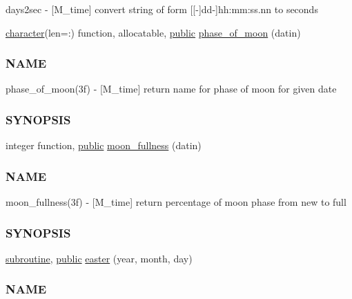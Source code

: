 \begin{DoxyCompactItemize}
\begin{DoxyCompactList}
days2sec -\/ \mbox{[}M\+\_\+time\mbox{]} convert string of form \mbox{[}\mbox{[}-\/\mbox{]}dd-\/\mbox{]}hh\+:mm\+:ss.\+nn to seconds \end{DoxyCompactList}\item 
\hyperlink{option__stopwatch_83_8txt_abd4b21fbbd175834027b5224bfe97e66}{character}(len=\+:) function, allocatable, \hyperlink{M__stopwatch_83_8txt_a2f74811300c361e53b430611a7d1769f}{public} \hyperlink{namespacem__time_ab8a976e2f113cc38b6df80974cee55dc}{phase\+\_\+of\+\_\+moon} (datin)
\begin{DoxyCompactList}\small\item\em \subsubsection*{N\+A\+ME}

phase\+\_\+of\+\_\+moon(3f) -\/ \mbox{[}M\+\_\+time\mbox{]} return name for phase of moon for given date \subsubsection*{S\+Y\+N\+O\+P\+S\+IS}\end{DoxyCompactList}\item 
integer function, \hyperlink{M__stopwatch_83_8txt_a2f74811300c361e53b430611a7d1769f}{public} \hyperlink{namespacem__time_a702b39998a769b8f60070c0bec975ee2}{moon\+\_\+fullness} (datin)
\begin{DoxyCompactList}\small\item\em \subsubsection*{N\+A\+ME}

moon\+\_\+fullness(3f) -\/ \mbox{[}M\+\_\+time\mbox{]} return percentage of moon phase from new to full \subsubsection*{S\+Y\+N\+O\+P\+S\+IS}\end{DoxyCompactList}\item 
\hyperlink{M__stopwatch_83_8txt_acfbcff50169d691ff02d4a123ed70482}{subroutine}, \hyperlink{M__stopwatch_83_8txt_a2f74811300c361e53b430611a7d1769f}{public} \hyperlink{namespacem__time_af3c98ac7124f9fe2584cc76688b00094}{easter} (year, month, day)
\begin{DoxyCompactList}\small\item\em \subsubsection*{N\+A\+ME}


\end{DoxyCompactList}
\end{DoxyCompactItemize}

